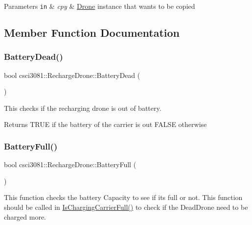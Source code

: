 \begin{DoxyParams}[1]{Parameters}
\mbox{\tt in}  & {\em cpy} & \hyperlink{classcsci3081_1_1Drone}{Drone} instance that wants to be copied \\
\hline
\end{DoxyParams}


\subsection{Member Function Documentation}
\mbox{\label{classcsci3081_1_1RechargeDrone_a17d45a9ee48936ddbe019e8ab677f7cf}} 
\subsubsection{\texorpdfstring{Battery\+Dead()}{BatteryDead()}}
{\footnotesize\ttfamily bool csci3081\+::\+Recharge\+Drone\+::\+Battery\+Dead (\begin{DoxyParamCaption}{ }\end{DoxyParamCaption})}



This checks if the recharging drone is out of battery. 

\begin{DoxyReturn}{Returns}
T\+R\+UE if the battery of the carrier is out F\+A\+L\+SE otherwise 
\end{DoxyReturn}
\mbox{\label{classcsci3081_1_1RechargeDrone_acc49b5dd6e59d7bc14be53536648288a}} 
\subsubsection{\texorpdfstring{Battery\+Full()}{BatteryFull()}}
{\footnotesize\ttfamily bool csci3081\+::\+Recharge\+Drone\+::\+Battery\+Full (\begin{DoxyParamCaption}{ }\end{DoxyParamCaption})}



This function checks the battery Capacity to see if it\textquotesingle{}s full or not. This function should be called in \hyperlink{classcsci3081_1_1RechargeDrone_af6c18a005a235b569b10225f9f0b3d78}{Is\+Charging\+Carrier\+Full()} to check if the Dead\+Drone need to be charged more. 

